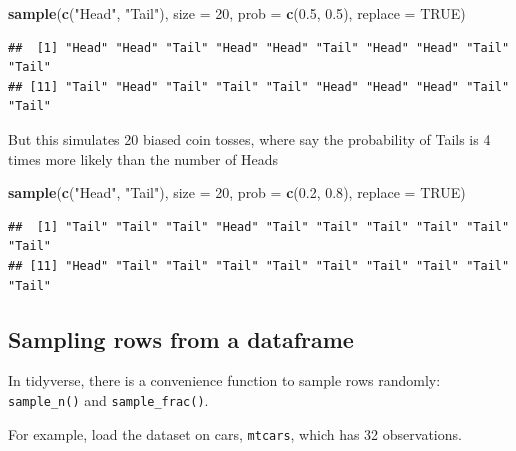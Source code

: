 \documentclass[
]{book}
\newenvironment{Shaded}{\begin{snugshade}}{\end{snugshade}}
\newcommand{\DataTypeTok}[1]{\textcolor[rgb]{0.13,0.29,0.53}{#1}}
\newcommand{\DecValTok}[1]{\textcolor[rgb]{0.00,0.00,0.81}{#1}}
\newcommand{\FloatTok}[1]{\textcolor[rgb]{0.00,0.00,0.81}{#1}}
\newcommand{\KeywordTok}[1]{\textcolor[rgb]{0.13,0.29,0.53}{\textbf{#1}}}
\newcommand{\NormalTok}[1]{#1}
\newcommand{\OtherTok}[1]{\textcolor[rgb]{0.56,0.35,0.01}{#1}}
\newcommand{\StringTok}[1]{\textcolor[rgb]{0.31,0.60,0.02}{#1}}
\theoremstyle{definition}
\theoremstyle{definition}
\theoremstyle{definition}
\theoremstyle{remark}
\begin{document}
\begin{Shaded}
\begin{Highlighting}[]
\KeywordTok{sample}\NormalTok{(}\KeywordTok{c}\NormalTok{(}\StringTok{"Head"}\NormalTok{, }\StringTok{"Tail"}\NormalTok{), }\DataTypeTok{size =} \DecValTok{20}\NormalTok{, }\DataTypeTok{prob =} \KeywordTok{c}\NormalTok{(}\FloatTok{0.5}\NormalTok{, }\FloatTok{0.5}\NormalTok{), }\DataTypeTok{replace =} \OtherTok{TRUE}\NormalTok{)}
\end{Highlighting}
\end{Shaded}

\begin{verbatim}
##  [1] "Head" "Head" "Tail" "Head" "Head" "Tail" "Head" "Head" "Tail" "Tail"
## [11] "Tail" "Head" "Tail" "Tail" "Tail" "Head" "Head" "Head" "Tail" "Tail"
\end{verbatim}

But this simulates 20 biased coin tosses, where say the probability of Tails is 4 times more likely than the number of Heads

\begin{Shaded}
\begin{Highlighting}[]
\KeywordTok{sample}\NormalTok{(}\KeywordTok{c}\NormalTok{(}\StringTok{"Head"}\NormalTok{, }\StringTok{"Tail"}\NormalTok{), }\DataTypeTok{size =} \DecValTok{20}\NormalTok{, }\DataTypeTok{prob =} \KeywordTok{c}\NormalTok{(}\FloatTok{0.2}\NormalTok{, }\FloatTok{0.8}\NormalTok{), }\DataTypeTok{replace =} \OtherTok{TRUE}\NormalTok{)}
\end{Highlighting}
\end{Shaded}

\begin{verbatim}
##  [1] "Tail" "Tail" "Tail" "Head" "Tail" "Tail" "Tail" "Tail" "Tail" "Tail"
## [11] "Head" "Tail" "Tail" "Tail" "Tail" "Tail" "Tail" "Tail" "Tail" "Tail"
\end{verbatim}

\hypertarget{sampling-rows-from-a-dataframe}{%
\subsection{Sampling rows from a dataframe}\label{sampling-rows-from-a-dataframe}}

In tidyverse, there is a convenience function to sample rows randomly: \texttt{sample\_n()} and \texttt{sample\_frac()}.

For example, load the dataset on cars, \texttt{mtcars}, which has 32 observations.
\end{document}
